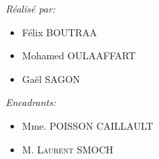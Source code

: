 \documentclass{article}
\begin{document}
\begin{titlepage}
\begin{sffamily}
\begin{center}
    \begin{minipage}{0.4\textwidth}
      \begin{flushleft} \large
\emph{Réalisé par:} \\
\begin{itemize} 
         \item  Félix \textsc{BOUTRAA}
	 \item  Mohamed \textsc{OULAAFFART}
	 \item    Gaël \textsc{SAGON}
     
\end{itemize} 
        \emph{}
      \end{flushleft}
    \end{minipage}
    \begin{minipage}{0.4\textwidth}
      \begin{flushright} \large
        \emph{Encadrants:}
\begin{itemize} 
     \item    Mme. \textsc{ POISSON CAILLAULT}
     \item   M. \textsc{Laurent SMOCH }
\end{itemize}
        \emph{}
      \end{flushright}
    \end{minipage}

    \vfill



  \end{center}
  \end{sffamily}
\end{titlepage}
\end{document}
